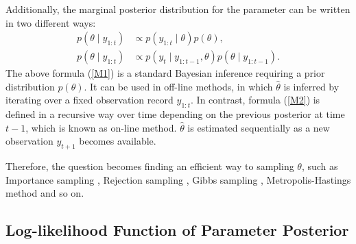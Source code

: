 Additionally, the marginal posterior distribution for the parameter can be written in two different ways: 
\begin{align}\label{M1}
p(\theta \mid y_{1:t}) &\propto p(y_{1:t}\mid\theta)p(\theta),\\
p(\theta \mid y_{1:t}) &\propto p(y_t\mid y_{1:t-1}, \theta)p(\theta\mid y_{1:t-1}). \label{M2}
\end{align}
The above formula (\ref{M1}) is a standard Bayesian inference requiring a prior distribution $p(\theta)$. It can be used in off-line methods, in which $\hat{\theta}$ is inferred by iterating over a fixed observation record $y_{1:t}$. In contrast, formula (\ref{M2}) is defined in a recursive way over time depending on the previous posterior at time $t-1$, which is known as on-line method. $\hat{\theta}$ is estimated sequentially as a new observation $y_{t+1}$ becomes available. 


Therefore, the question becomes finding an efficient way to sampling $\theta$, such as Importance sampling \citep{hammersley1964percolation, geweke1989bayesian}, Rejection sampling \citep{casella2004generalized, martino2010generalized}, Gibbs sampling \citep{geman1984stochastic}, Metropolis-Hastings method \citep{metropolis1953equation, hastings1970monte} and so on. 

\subsection{Log-likelihood Function of Parameter Posterior}\label{sectionlogParameter}

